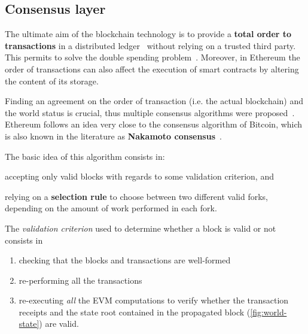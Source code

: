 \subsection{Consensus layer}
\label{sec:consensus}

The ultimate aim of the blockchain technology is to provide a \textbf{total
order to transactions} in a distributed ledger~\cite{bib:the-quest} without
relying on a trusted third party. This permits to solve the double spending
problem~\cite{bib:bitcoin}. Moreover, in Ethereum the order of transactions can
also affect the execution of smart contracts by altering the content of its
storage.

Finding an agreement on the order of transaction (i.e. the actual blockchain)
and the world status is crucial, thus multiple consensus algorithms were
proposed~\cite{}. Ethereum follows an idea very close to the consensus algorithm
of Bitcoin, which is also known in the literature as \textbf{Nakamoto
consensus}~\cite{}.

The basic idea of this algorithm consists in:
\begin{enumerate*}[label=(\arabic*)]
	\item accepting only valid blocks with regards to some validation criterion,
	and
	\item relying on a \textbf{selection rule} to choose between two different
	valid forks, depending on the amount of work performed in each fork.
\end{enumerate*}

The \emph{validation criterion} used to determine whether a block is valid or
not consists in
\begin{enumerate}
	\item checking that the blocks and transactions are well-formed
	\item re-performing all the transactions
	\item re-executing \emph{all}	the EVM computations to verify whether the
	transaction receipts and the state root contained in the propagated block
	(\autoref{fig:world-state}) are valid.
\end{enumerate}

